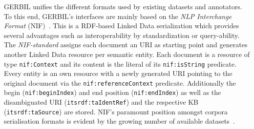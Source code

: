 GERBIL unifies the different formats used by existing datasets and annotators.
To this end, GERBIL's interfaces are mainly based on the \emph{NLP Interchange Format} (NIF)~\cite{ISWC2013NIF}.
This is a \ac{RDF}-based Linked Data serialization which provides several advantages such as interoperability by standardization or query-ability.
The \emph{NIF-standard} assigns each document an URI as starting point and generates another Linked Data resource per semantic entity.
Each document is a resource of type \texttt{nif:Context} and its content is the literal of its \texttt{nif:isString} predicate. 
Every entity is an own resource with a newly generated URI pointing to the original document via the \texttt{nif:referenceContext} predicate.
Additionally the begin (\texttt{nif:beginIndex}) and end position (\texttt{nif:endIndex}) as well as the disambiguated URI (\texttt{itsrdf:taIdentRef}) and the respective \ac{KB} (\texttt{itsrdf:taSource}) are stored.
NIF's paramount position amongst corpora serialisation formats is evident by the growing number of available datasets~\cite{GERBIL}.

%

